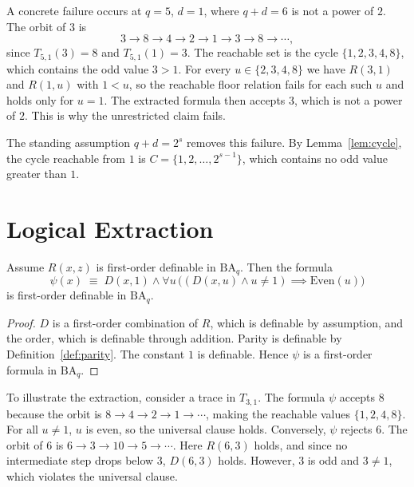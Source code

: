 \documentclass[runningheads]{llncs}
\begin{document}
A concrete failure occurs at $q = 5$, $d = 1$, where $q+d = 6$ is not a
power of $2$. The orbit of $3$ is
\[
3 \to 8 \to 4 \to 2 \to 1 \to 3 \to 8 \to \cdots,
\]
since $T_{5,1}(3) = 8$ and $T_{5,1}(1) = 3$. The reachable set is the
cycle $\{1,2,3,4,8\}$, which contains the odd value $3 > 1$. For every
$u \in \{2,3,4,8\}$ we have $R(3,1)$ and $R(1,u)$ with $1 < u$, so the
reachable floor relation fails for each such $u$ and holds only for $u =
1$. The extracted formula then accepts $3$, which is not a power of $2$.
This is why the unrestricted claim fails.

The standing assumption $q+d = 2^s$ removes this failure. By
Lemma~\ref{lem:cycle}, the cycle reachable from $1$ is $C =
\{1,2,\dots,2^{s-1}\}$, which contains no odd value greater than $1$.



\section{Logical Extraction}
\label{sec:extraction}

\begin{lemma}\label{lem:extraction}
Assume $R(x,z)$ is first-order definable in $\mathrm{BA}_q$. Then the
formula
\[
\psi(x) \;\equiv\; D(x,1) \land \forall u\,\bigl( (D(x,u) \land u \neq
1) \implies \mathrm{Even}(u) \bigr)
\]
is first-order definable in $\mathrm{BA}_q$.
\end{lemma}
\begin{proof}
$D$ is a first-order combination of $R$, which is definable by
assumption, and the order, which is definable through addition. Parity
is definable by Definition~\ref{def:parity}. The constant $1$ is
definable. Hence $\psi$ is a first-order formula in $\mathrm{BA}_q$.
\end{proof}

To illustrate the extraction, consider a trace in $T_{3,1}$. The formula $\psi$ accepts $8$ because the orbit is $8 \to 4 \to 2 \to 1 \to \cdots$, making the reachable values $\{1, 2, 4, 8\}$. For all $u \neq 1$, $u$ is even, so the universal clause holds. Conversely, $\psi$ rejects $6$. The orbit of $6$ is $6 \to 3 \to 10 \to 5 \to \cdots$. Here $R(6,3)$ holds, and since no intermediate step drops below $3$, $D(6,3)$ holds. However, $3$ is odd and $3 \neq 1$, which violates the universal clause.

\end{document}

